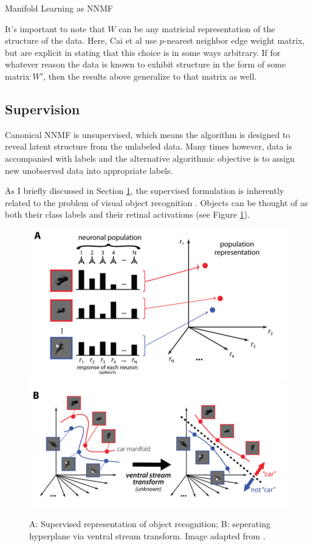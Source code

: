 \documentclass[12pt]{pom_thesis}
\begin{document}
\begin{chapter}{Manifold Learning as NNMF}
	\begin{algorithm}[H]
		\caption{Multiplicative Update for Graph Regularized NNMF}
	\end{algorithm}
	It's important to note that $W$ can be any matricial representation of the structure of the data. Here, Cai et al use $p$-nearest neighbor edge weight matrix, but are explicit in stating that this choice is in some ways arbitrary. If for whatever reason the data is known to exhibit structure in the form of some matrix $W'$, then the results above generalize to that matrix as well.
	\subsection*{Supervision}
	Canonical NNMF is unsupervised, which means the algorithm is designed to reveal latent structure from the unlabeled data. Many times however, data is accompanied with labels and the alternative algorithmic objective is to assign new unobserved data into appropriate labels.
	
	As I briefly discussed in Section \ref{manifold}, the supervised formulation is inherently related to the problem of visual object recognition \cite{biederman1987recognition}. Objects can be thought of as both their class labels and their retinal activations (see Figure \ref{manifold}).
\begin{figure}[h]
	\label{manifold}
	\centering
	\includegraphics[width=.42\textwidth]{manifoldA}
		\includegraphics[width=.57\textwidth]{manifoldB}
	\caption{A: Supervised representation of object recognition; B: seperating hyperplane via ventral stream transform. Image adapted from \cite{dicarlo2012does}.}
\end{figure}	


\end{chapter}
\end{document}
